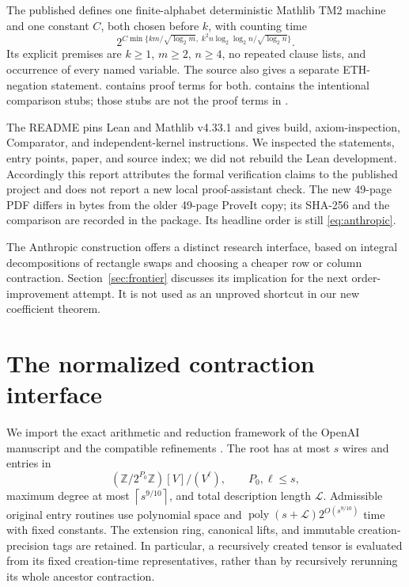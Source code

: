 \documentclass[11pt]{article}
\theoremstyle{definition}\newtheorem{definition}[theorem]{Definition}
\theoremstyle{remark}\newtheorem{remark}[theorem]{Remark}
\newcommand{\poly}{\operatorname{poly}}
\newcommand{\ceil}[1]{\left\lceil#1\right\rceil}
\begin{document}
The published  defines one finite-alphabet
deterministic Mathlib TM2 machine and one constant $C$, both chosen before
$k$, with counting time
\begin{equation}\label{eq:anthropic}
 2^{C\min\{km/\sqrt{\log_2m},\;
 k^2n\log_2\log_2n/\sqrt{\log_2n}\}}.
\end{equation}
Its explicit premises are $k\ge1$, $m\ge2$, $n\ge4$, no repeated clause
lists, and occurrence of every named variable. The source also gives a
separate ETH-negation statement.  contains proof terms
for both.  contains the intentional comparison stubs;
those stubs are not the proof terms in .

The README pins Lean and Mathlib v4.33.1 and gives build, axiom-inspection,
Comparator, and independent-kernel instructions. We inspected the statements,
entry points, paper, and source index; we did not rebuild the Lean development.
Accordingly this report attributes the formal verification claims to the
published project and does not report a new local proof-assistant check.
The new 49-page PDF differs in bytes from the older 49-page ProveIt copy;
its SHA-256 and the comparison are recorded in the package. Its headline
order is still \eqref{eq:anthropic}.

The Anthropic construction offers a distinct research interface, based on
integral decompositions of rectangle swaps and choosing a cheaper row or
column contraction. Section~\ref{sec:frontier} discusses its implication
for the next order-improvement attempt. It is not used as an unproved
shortcut in our new coefficient theorem.

\section{The normalized contraction interface}
\label{sec:interface}

We import the exact arithmetic and reduction framework of the OpenAI
manuscript and the compatible refinements \cite{openai,asymmetric,joint,trees}.
The root has at most $s$ wires and entries in
\[
 (\mathbb Z/2^{P_0}\mathbb Z)[V]/(V^\ell),\qquad P_0,\ell\le s,
\]
maximum degree at most $\ceil{s^{9/10}}$, and total description length
$\mathcal L$. Admissible original entry routines use polynomial space and
$\poly(s+\mathcal L)2^{O(s^{9/10})}$ time with fixed constants. The extension
ring, canonical lifts, and immutable creation-precision tags are retained.
In particular, a recursively created tensor is evaluated from its fixed
creation-time representatives, rather than by recursively rerunning its
whole ancestor contraction.
\end{document}
